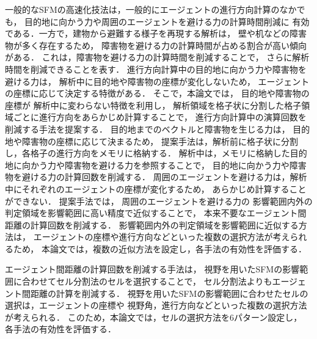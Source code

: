一般的なSFMの高速化技法は，一般的にエージェントの進行方向計算のなかでも，
目的地に向かう力や周囲のエージェントを避ける力の計算時間削減に
有効である．一方で，建物から避難する様子を再現する解析は，
壁や机などの障害物が多く存在するため，
障害物を避ける力の計算時間が占める割合が高い傾向がある．
これは，障害物を避ける力の計算時間を削減することで，
さらに解析時間を削減できることを表す．
進行方向計算中の目的地に向かう力や障害物を避ける力は，
解析中に目的地や障害物の座標が変化しないため，
エージェントの座標に応じて決定する特徴がある．
そこで，本論文では，
目的地や障害物の座標が
解析中に変わらない特徴を利用し，
解析領域を格子状に分割した格子領域ごとに進行方向をあらかじめ計算することで，
進行方向計算中の演算回数を削減する手法を提案する．
目的地までのベクトルと障害物を生じる力は，
目的地や障害物の座標に応じて決まるため，
提案手法は，解析前に格子状に分割し，各格子の進行方向をメモリに格納する．
解析中は，メモリに格納した目的地に向かう力や障害物を避ける力を参照することで，
目的地に向かう力や障害物を避ける力の計算回数を削減する．
周囲のエージェントを避ける力は，解析中にそれぞれのエージェントの座標が変化するため，
あらかじめ計算することができない．
提案手法では，
周囲のエージェントを避ける力の
影響範囲内外の判定領域を影響範囲に高い精度で近似することで，
本来不要なエージェント間距離の計算回数を削減する．
影響範囲内外の判定領域を影響範囲に近似する方法は，
エージェントの座標や進行方向などといった複数の選択方法が考えられるため，
本論文では，複数の近似方法を設定し，各手法の有効性を評価する．

エージェント間距離の計算回数を削減する手法は，
視野を用いたSFMの影響範囲に合わせてセル分割法のセルを選択することで，
セル分割法よりもエージェント間距離の計算を削減する．
視野を用いたSFMの影響範囲に合わせたセルの選択は，エージェントの座標や
視野角，進行方向などといった複数の選択方法が考えられる．
このため，本論文では，セルの選択方法を6パターン設定し，
各手法の有効性を評価する．
\fi 


